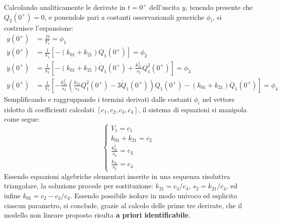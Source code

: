 Calcolando analiticamente le derivate in $t=0^+$ dell'uscita $y$, tenendo presente che $Q_2(0^+)=0$, e ponendole pari a costanti osservazionali generiche $\phi_i$, si costruisce l'espansione:
\begin{align*}
y(0^+) &= \frac{D}{V_1} = \phi_1 \\
\dot{y}(0^+) &= \frac{1}{V_1}[-(k_{01} + k_{21})Q_1(0^+)] = \phi_2 \\
\ddot{y}(0^+) &= \frac{1}{V_1}\left[-(k_{01} + k_{21})\dot{Q}_1(0^+) + \frac{k_{21}^2}{s_2}Q_1^2(0^+)\right] = \phi_3 \\
\dddot{y}(0^+) &= \frac{1}{V_1}\left[-\frac{k_{21}^2}{s_2}\left(\frac{k_{21}}{s_2}Q_1^2(0^+) - 3\dot{Q}_1(0^+)\right)Q_1(0^+) - (k_{01} + k_{21})\ddot{Q}_1(0^+)\right] = \phi_4
\end{align*}
Semplificando e raggruppando i termini derivati dalle costanti $\phi_i$ nel vettore ridotto di coefficienti calcolati $[c_1, c_2, c_3, c_4]$, il sistema di equazioni si manipola come segue:
\begin{equation}
\begin{cases}
V_1 = c_1 \\
k_{01} + k_{21} = c_2 \\
\frac{k_{21}^2}{s_2} = c_3 \\
\frac{k_{21}}{s_2} = c_4
\end{cases}
\end{equation}
Essendo equazioni algebriche elementari inserite in una sequenza risolutiva triangolare, la soluzione procede per sostituzione: $k_{21} = c_3/c_4$, $s_2 = k_{21}/c_4$, ed infine $k_{01} = c_2 - c_3/c_4$. Essendo possibile isolare in modo univoco ed esplicito ciascun parametro, si conclude, grazie al calcolo delle prime tre derivate, che il modello non lineare proposto risulta \textbf{a priori identificabile}.
